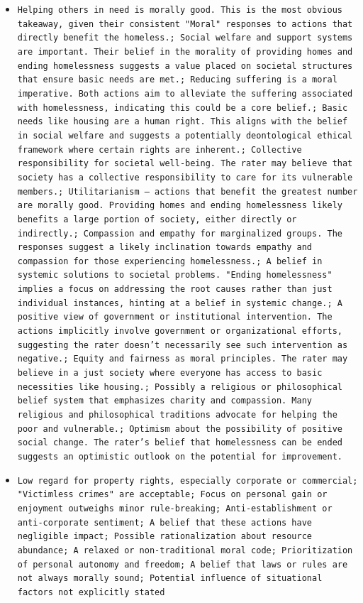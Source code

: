 \documentclass[11pt]{article}
\begin{document}
\begin{itemize}
\item \texttt{Helping others in need is morally good. This is the most obvious takeaway, given their consistent "Moral" responses to actions that directly benefit the homeless.; Social welfare and support systems are important. Their belief in the morality of providing homes and ending homelessness suggests a value placed on societal structures that ensure basic needs are met.; Reducing suffering is a moral imperative. Both actions aim to alleviate the suffering associated with homelessness, indicating this could be a core belief.; Basic needs like housing are a human right. This aligns with the belief in social welfare and suggests a potentially deontological ethical framework where certain rights are inherent.; Collective responsibility for societal well-being.  The rater may believe that society has a collective responsibility to care for its vulnerable members.; Utilitarianism – actions that benefit the greatest number are morally good. Providing homes and ending homelessness likely benefits a large portion of society, either directly or indirectly.; Compassion and empathy for marginalized groups.  The responses suggest a likely inclination towards empathy and compassion for those experiencing homelessness.; A belief in systemic solutions to societal problems.  "Ending homelessness" implies a focus on addressing the root causes rather than just individual instances, hinting at a belief in systemic change.; A positive view of government or institutional intervention. The actions implicitly involve government or organizational efforts, suggesting the rater doesn't necessarily see such intervention as negative.; Equity and fairness as moral principles.  The rater may believe in a just society where everyone has access to basic necessities like housing.; Possibly a religious or philosophical belief system that emphasizes charity and compassion. Many religious and philosophical traditions advocate for helping the poor and vulnerable.; Optimism about the possibility of positive social change.  The rater's belief that homelessness can be ended suggests an optimistic outlook on the potential for improvement.}
\item \texttt{Low regard for property rights, especially corporate or commercial; "Victimless crimes" are acceptable; Focus on personal gain or enjoyment outweighs minor rule-breaking; Anti-establishment or anti-corporate sentiment; A belief that these actions have negligible impact; Possible rationalization about resource abundance; A relaxed or non-traditional moral code; Prioritization of personal autonomy and freedom; A belief that laws or rules are not always morally sound; Potential influence of situational factors not explicitly stated}

\end{itemize}
\end{document}
